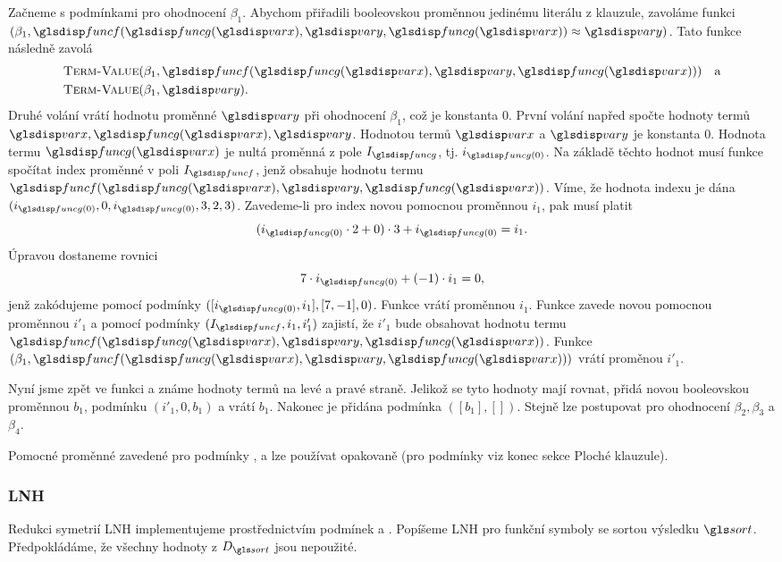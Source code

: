 {Začneme s podmínkami pro ohodnocení $\beta_1$. Abychom
přiřadili booleovskou proměnnou jedinému literálu
z klauzule, zavoláme funkci \VarForAtom$(\beta_1, \allowbreak
\func(\funcG(\var), \varY, \funcG(\var)) \approx \varY)$.
Tato funkce následně zavolá
\begin{align*}
&\TermValue(\beta_1, \func(\funcG(\var), \varY, \funcG(\var))) \quad\text{a} \\
&\TermValue(\beta_1, \varY).
\end{align*}
Druhé volání vrátí hodnotu proměnné $\varY$ při ohodnocení $\beta_1$,
což je konstanta 0. První volání napřed spočte hodnoty
termů $\var, \funcG(\var), \varY$. Hodnotou termů $\var$ a $\varY$
je konstanta 0. Hodnota termu $\funcG(\var)$ je nultá proměnná
z pole $I_\funcG$, tj. $i_{\funcG(0)}$.
Na základě těchto hodnot musí funkce \Index{} spočítat
index proměnné v poli $I_\func$, jenž obsahuje hodnotu termu
$\func(\funcG(\var), \varY, \funcG(\var))$. Víme,
že hodnota indexu je dána
\Horner$(i_{\funcG(0)}, 0, i_{\funcG(0)}, 3, 2, 3)$.
Zavedeme-li pro index novou pomocnou proměnnou $i_1$, pak musí platit
\[
  (i_{\funcG(0)} \cdot 2 + 0) \cdot 3 + i_{\funcG(0)} = i_1.
\]
Úpravou dostaneme rovnici
\[
  7 \cdot i_{\funcG(0)} + (-1) \cdot i_1 = 0,
\]
jenž zakódujeme pomocí podmínky \Linear$([i_{\funcG(0)}, i_1], [7, -1], 0)$.
Funkce \Index{} vrátí proměnnou $i_1$. Funkce \TermValue{}
zavede novou pomocnou proměnnou $i'_1$ a pomocí podmínky
\Element$(I_\func, i_1, i'_1)$ zajistí, že $i'_1$ bude obsahovat hodnotu termu
$\func(\funcG(\var), \varY, \funcG(\var))$. Funkce
\TermValue$(\beta_1, \func(\funcG(\var), \varY, \funcG(\var)))$
vrátí proměnou $i'_1$.

Nyní jsme zpět ve funkci \VarForAtom{} a známe hodnoty
termů na levé a pravé straně. Jelikož se tyto hodnoty
mají rovnat, přidá \VarForAtom{} novou booleovskou proměnnou $b_1$,
podmínku \Eq$(i'_1, 0, b_1)$ a vrátí $b_1$.
Nakonec je přidána podmínka \Clause$([b_1], [])$.
Stejně lze postupovat pro ohodnocení $\beta_2, \beta_3$ a $\beta_4$.

Pomocné proměnné zavedené pro podmínky \Linear{}, \Element{} a \Eq{}
lze používat opakovaně (pro podmínky \Eq{} viz konec sekce
Ploché klauzule).

\subsubsection{LNH}

Redukci symetrií LNH implementujeme prostřednictvím podmínek
\LowerEq{} a \Precede{}. Popíšeme LNH pro funkční symboly
se sortou výsledku $\sort$. Před\-po\-klá\-dáme,
že všechny hodnoty z $D_\sort$ jsou nepoužité.

}
